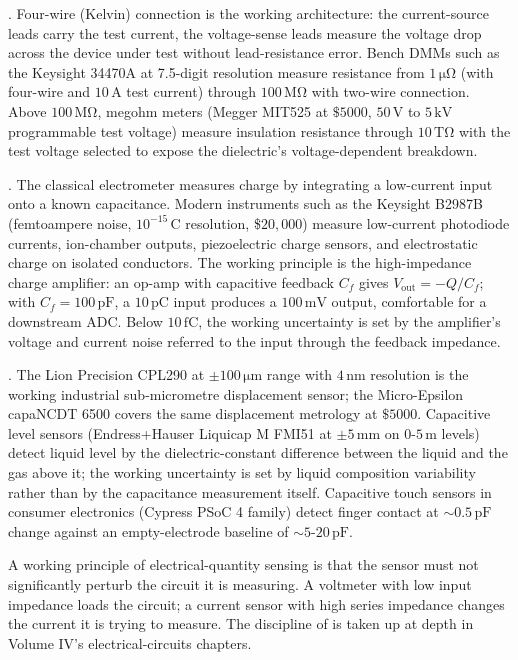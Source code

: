 . Four-wire (Kelvin) connection is
the working architecture: the current-source leads carry the
test current, the voltage-sense leads measure the voltage drop
across the device under test without lead-resistance error. Bench
DMMs such as the Keysight 34470A at 7.5-digit resolution measure
resistance from $1\,\si{\micro\ohm}$ (with four-wire and
$10\,\si{\ampere}$ test current) through $100\,\si{\mega\ohm}$
with two-wire connection. Above $100\,\si{\mega\ohm}$, megohm
meters (Megger MIT525 at $\$5000$, $50\,\si{\volt}$ to $5\,\si{
\kilo\volt}$ programmable test voltage) measure insulation
resistance through $10\,\si{\tera\ohm}$ with the test voltage
selected to expose the dielectric's voltage-dependent breakdown.

. The classical electrometer measures
charge by integrating a low-current input onto a known
capacitance. Modern instruments such as the Keysight B2987B
(femtoampere noise, $10^{-15}\,\si{\coulomb}$ resolution, \$$20{,}000$)
measure low-current photodiode currents, ion-chamber outputs,
piezoelectric charge sensors, and electrostatic charge on
isolated conductors. The working principle is the high-impedance
charge amplifier: an op-amp with capacitive feedback $C_{f}$
gives $V_{\text{out}} = -Q/C_{f}$; with $C_{f} = 100\,\si{\pico
\farad}$, a $10\,\si{\pico\coulomb}$ input produces a $100\,\si{
\milli\volt}$ output, comfortable for a downstream ADC. Below
$10\,\si{\femto\coulomb}$, the working uncertainty is set by the
amplifier's voltage and current noise referred to the input
through the feedback impedance.

. The Lion Precision CPL290 at
$\pm 100\,\si{\micro\meter}$ range with $4\,\si{\nano\meter}$
resolution is the working industrial sub-micrometre displacement
sensor; the Micro-Epsilon capaNCDT 6500 covers the same
displacement metrology at $\$5000$. Capacitive level sensors
(Endress+Hauser Liquicap M FMI51 at $\pm 5\,\si{\milli\meter}$ on
$0$-$5\,\si{\meter}$ levels) detect liquid level by the
dielectric-constant difference between the liquid and the gas
above it; the working uncertainty is set by liquid composition
variability rather than by the capacitance measurement itself.
Capacitive touch sensors in consumer electronics (Cypress
PSoC 4 family) detect finger contact at $\sim 0.5\,\si{\pico
\farad}$ change against an empty-electrode baseline of $\sim 5$-$
20\,\si{\pico\farad}$.

A working principle of electrical-quantity sensing is that the
sensor must not significantly perturb the circuit it is measuring.
A voltmeter with low input impedance loads the circuit; a current
sensor with high series impedance changes the current it is trying
to measure. The discipline of  is taken
up at depth in Volume IV's electrical-circuits chapters.

